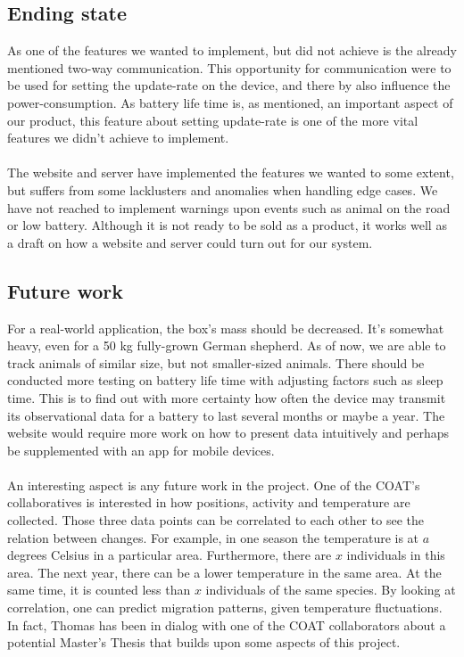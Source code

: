 	\subsection{Ending state}
		As one of the features we wanted to implement, but did not achieve is the already mentioned two-way communication. This opportunity for communication were to be used for setting the update-rate on the device, and there by also influence the power-consumption. As battery life time is, as mentioned, an important aspect of our product, this feature about setting update-rate is one of the more vital features we didn't achieve to implement. \\\\
		The website and server have implemented the features we wanted to some extent, but suffers from some lacklusters and anomalies when handling edge cases. We have not reached to implement warnings upon events such as animal on the road or low battery. Although it is not ready to be sold as a product, it works well as a draft on how a website and server could turn out for our system. 

	\subsection{Future work}
	For a real-world application, the box's mass should be decreased. It's somewhat heavy, even for a 50 kg 	fully-grown German shepherd. As of now, we are able to track animals of similar size, but not smaller-sized animals. There should be conducted more testing on battery life time with adjusting factors such as sleep time. This is to find out with more certainty how often the device may transmit its observational data for a battery to last several months or maybe a year. 
	The website would require more work on how to present data intuitively and perhaps be supplemented with an app for mobile devices.   
	\\\\
		An interesting aspect is any future work in the project. One of the COAT's collaboratives is interested in how positions, activity and temperature are collected. Those three data points can be correlated to each other to see the relation between changes. For example, in one season the temperature is at $a$ degrees Celsius in a particular area. Furthermore, there are $x$ individuals in this area. The next year, there can be a lower temperature in the same area. At the same time, it is counted less than $x$ individuals of the same species. By looking at correlation, one can predict migration patterns, given temperature fluctuations. In fact, Thomas has been in dialog with one of the COAT collaborators about a potential Master's Thesis that builds upon some aspects of this project. 
		
